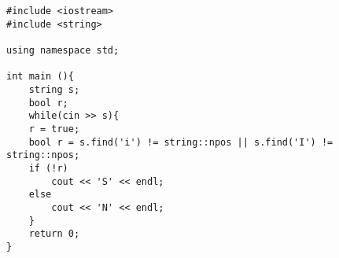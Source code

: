 
\begin{verbatim}
#include <iostream>
#include <string>

using namespace std;

int main (){
	string s;
	bool r;
	while(cin >> s){
	r = true;
	bool r = s.find('i') != string::npos || s.find('I') != string::npos;
	if (!r)
		cout << 'S' << endl;
	else
		cout << 'N' << endl;
	}
	return 0;
}
\end{verbatim}
